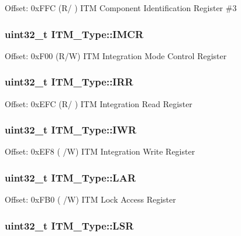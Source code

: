 Offset\-: 0x\-F\-F\-C (R/ ) I\-T\-M Component Identification Register \#3 \hypertarget{structITM__Type_ab2e87d8bb0e3ce9b8e0e4a6a6695228a}{
\subsubsection[{I\-M\-C\-R}]{ uint32\-\_\-t I\-T\-M\-\_\-\-Type\-::\-I\-M\-C\-R}}\label{structITM__Type_ab2e87d8bb0e3ce9b8e0e4a6a6695228a}
Offset\-: 0x\-F00 (R/\-W) I\-T\-M Integration Mode Control Register \hypertarget{structITM__Type_a212a614a8d5f2595e5eb049e5143c739}{
\subsubsection[{I\-R\-R}]{ uint32\-\_\-t I\-T\-M\-\_\-\-Type\-::\-I\-R\-R}}\label{structITM__Type_a212a614a8d5f2595e5eb049e5143c739}
Offset\-: 0x\-E\-F\-C (R/ ) I\-T\-M Integration Read Register \hypertarget{structITM__Type_afd0e0c051acd3f6187794a4e8dc7e7ea}{
\subsubsection[{I\-W\-R}]{ uint32\-\_\-t I\-T\-M\-\_\-\-Type\-::\-I\-W\-R}}\label{structITM__Type_afd0e0c051acd3f6187794a4e8dc7e7ea}
Offset\-: 0x\-E\-F8 ( /\-W) I\-T\-M Integration Write Register \hypertarget{structITM__Type_a97840d39a9c63331e3689b5fa69175e9}{
\subsubsection[{L\-A\-R}]{ uint32\-\_\-t I\-T\-M\-\_\-\-Type\-::\-L\-A\-R}}\label{structITM__Type_a97840d39a9c63331e3689b5fa69175e9}
Offset\-: 0x\-F\-B0 ( /\-W) I\-T\-M Lock Access Register \hypertarget{structITM__Type_aaa0515b1f6dd5e7d90b61ef67d8de77b}{
\subsubsection[{L\-S\-R}]{ uint32\-\_\-t I\-T\-M\-\_\-\-Type\-::\-L\-S\-R}}\label{structITM__Type_aaa0515b1f6dd5e7d90b61ef67d8de77b}
